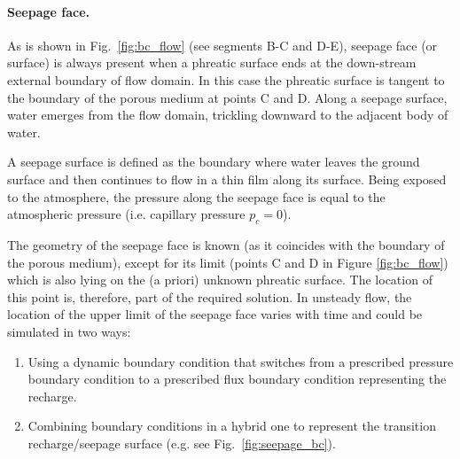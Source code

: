 \paragraph{Seepage face.}
As is shown in Fig.~\ref{fig:bc_flow} (see segments B-C and D-E), seepage face (or surface) 
is always present when a phreatic surface ends at the down-stream external boundary of flow domain.
In this case the phreatic surface is tangent to the boundary of the porous medium at points C and D.
Along a seepage surface, water emerges from the flow domain, trickling downward to the adjacent body of water.

A seepage surface is defined as the boundary 
where water leaves the ground surface and then continues to flow in a thin film along its surface.
Being exposed to the atmosphere, the pressure along the seepage face is equal to the atmospheric pressure 
(i.e. capillary pressure $p_{c}=0$). 

The geometry of the seepage face is known (as it coincides with the boundary of the porous medium), 
except for its limit (points C and D in Figure \ref{fig:bc_flow}) 
which is also lying on the (a priori) unknown phreatic surface.
The location of this point is, therefore, part of the required solution.
In unsteady flow, the location of the upper limit of the seepage face varies with time
and could be simulated in two ways:
\begin{enumerate}
\item Using a dynamic boundary condition that switches from a prescribed pressure boundary condition
to a prescribed flux boundary condition representing the recharge.
\item Combining boundary conditions in a hybrid one to represent the transition recharge/seepage 
surface (e.g. see Fig.~\ref{fig:seepage_bc}).
\end{enumerate}


